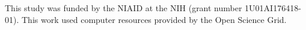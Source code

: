 This study was funded by the NIAID at the NIH (grant number 1U01AI176418-01). This work used computer resources provided by the Open Science Grid.



\address{%
Erik S. Wright\\
University of Pittsburgh\\%
Department of Biomedical Informatics\\ Pittsburgh, PA, USA\\
%
%
\textit{ORCiD: \href{https://orcid.org/0000-0002-1457-4019}{0000-0002-1457-4019}}\\%
\href{mailto:eswright@pitt.edu}{\nolinkurl{eswright@pitt.edu}}%
}
